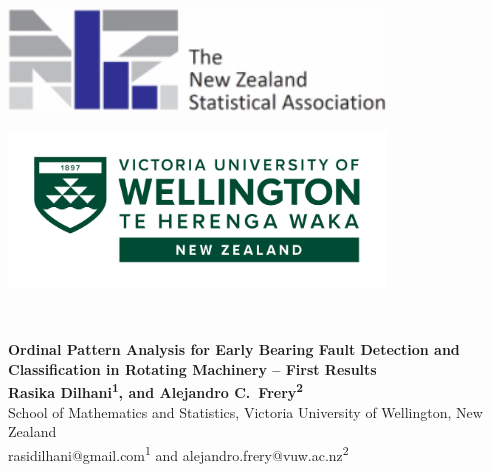 \documentclass[a0,portrait]{a0poster}
\begin{document}
\begin{mdframed}[style=MyFrame]

\begin{minipage}[b]{0.33\linewidth}
\raggedright
\includegraphics[width=10cm,valign=t]{NZSA-logo-words-e1505785105112-1.png}
\end{minipage}
%
\begin{minipage}[b]{0.33\linewidth}
\centering
\end{minipage}
% 
\begin{minipage}[b]{0.33\linewidth}
\raggedleft
\includegraphics[width=10cm,valign=t]{Logo Offshore Standard Landscape Reversed RGB.png}
\end{minipage}\\

\vspace{3cm}
\begin{minipage}[h]{0.98\linewidth}
\centering \huge \color{SteelBlue} \textbf{Ordinal Pattern Analysis for Early Bearing Fault Detection and Classification in Rotating Machinery -- First Results} \color{Black}\\ %
\Large \textbf{Rasika Dilhani\textsuperscript{1}, and Alejandro C.\ Frery\textsuperscript{2}}\\ %
\normalsize School of Mathematics and Statistics, Victoria University of Wellington, New Zealand \\ %
rasidilhani@gmail.com\textsuperscript{1} and alejandro.frery@vuw.ac.nz\textsuperscript{2}\\
\end{minipage}
\vspace{0.5cm} %


\end{mdframed}
\end{document}
